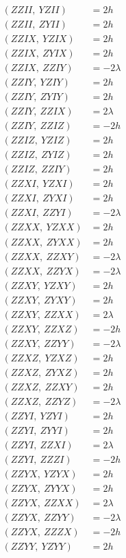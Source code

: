 \documentclass{article}
\begin{document}
\begin{align*}
  (ZZII,\ YZII) &= 2 h \\
  (ZZII,\ ZYII) &= 2 h \\
  (ZZIX,\ YZIX) &= 2 h \\
  (ZZIX,\ ZYIX) &= 2 h \\
  (ZZIX,\ ZZIY) &= - 2 \lambda \\
  (ZZIY,\ YZIY) &= 2 h \\
  (ZZIY,\ ZYIY) &= 2 h \\
  (ZZIY,\ ZZIX) &= 2 \lambda \\
  (ZZIY,\ ZZIZ) &= - 2 h \\
  (ZZIZ,\ YZIZ) &= 2 h \\
  (ZZIZ,\ ZYIZ) &= 2 h \\
  (ZZIZ,\ ZZIY) &= 2 h \\
  (ZZXI,\ YZXI) &= 2 h \\
  (ZZXI,\ ZYXI) &= 2 h \\
  (ZZXI,\ ZZYI) &= - 2 \lambda \\
  (ZZXX,\ YZXX) &= 2 h \\
  (ZZXX,\ ZYXX) &= 2 h \\
  (ZZXX,\ ZZXY) &= - 2 \lambda \\
  (ZZXX,\ ZZYX) &= - 2 \lambda \\
  (ZZXY,\ YZXY) &= 2 h \\
  (ZZXY,\ ZYXY) &= 2 h \\
  (ZZXY,\ ZZXX) &= 2 \lambda \\
  (ZZXY,\ ZZXZ) &= - 2 h \\
  (ZZXY,\ ZZYY) &= - 2 \lambda \\
  (ZZXZ,\ YZXZ) &= 2 h \\
  (ZZXZ,\ ZYXZ) &= 2 h \\
  (ZZXZ,\ ZZXY) &= 2 h \\
  (ZZXZ,\ ZZYZ) &= - 2 \lambda \\
  (ZZYI,\ YZYI) &= 2 h \\
  (ZZYI,\ ZYYI) &= 2 h \\
  (ZZYI,\ ZZXI) &= 2 \lambda \\
  (ZZYI,\ ZZZI) &= - 2 h \\
  (ZZYX,\ YZYX) &= 2 h \\
  (ZZYX,\ ZYYX) &= 2 h \\
  (ZZYX,\ ZZXX) &= 2 \lambda \\
  (ZZYX,\ ZZYY) &= - 2 \lambda \\
  (ZZYX,\ ZZZX) &= - 2 h \\
  (ZZYY,\ YZYY) &= 2 h \\

\end{align*}
\end{document}
